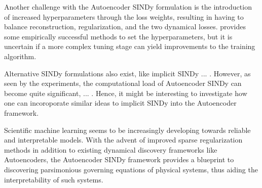Another challenge with the Autoencoder SINDy formulation is the introduction of increased hyperparameters through the loss weights, resulting in having to balance reconstruction, regularization, and the two dynamical losses. 
\textcite{Champion_2019} provides some empirically successful methods to set the hyperparameters, but it is uncertain if a more complex tuning stage can yield improvements to the training algorithm. 

Alternative SINDy formulations also exist, like implicit SINDy \textcite{} ... . However, as seen by the experiments, the computational load of Autoencoder SINDy can become quite significant, ... . Hence, it might be interesting to investigate how one can incoroporate similar ideas to implicit SINDy into the Autoencoder framework. 

Scientific machine learning seems to be increasingly developing towards reliable and interpretable models. 
With the advent of improved sparse regularization methods in addition to existing dynamical discovery frameworks like Autoencoders, the Autoencoder SINDy framework provides a blueprint to discovering parsimonious governing equations of physical systems, thus aiding the interpretability of such systems. 
